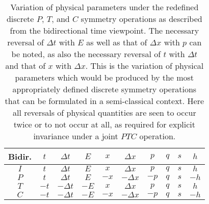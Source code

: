 \documentclass[notitlepage,12pt]{report}
\begin{document}
\begin{table}
\begin{center}
\begin{tabular}{c||c|c|c||c|c|c||c|c|c}
Bidir. & $t$  & $\Delta t$  & $E$ & $x$ & $\Delta x$ & $p$ & $q$ & $s$ & $h$ \\  \hline\hline
$I$ & $t$  & $\Delta t$  & $E$ & $x$ & $\Delta x$ & $p$ & $q$ & $s$ & $h$ \\  \hline
$P$ & $t$  & $\Delta t$  & $E$ & $-x$ & $-\Delta x$ & $-p$ & $q$ & $s$ & $-h$ \\  \hline
$T$ & $-t$ & $-\Delta t$  & $-E$ & $x$ & $\Delta x$ & $p$ & $q$ & $s$ & $h$  \\  \hline
$C$ & $-t$ & $-\Delta t$  & $-E$ & $-x$ & $-\Delta x$ & $-p$ & $q$ & $s$ & $-h$  
\end{tabular}
\end{center}
\caption[Variation of physical parameters under the redefined discrete $P$, $T$, and $C$ symmetry operations as described from the bidirectional time viewpoint]{Variation of physical parameters under the redefined discrete $P$, $T$, and $C$ symmetry operations as described from the bidirectional time viewpoint. The necessary reversal of $\Delta t$ with $E$ as well as that of $\Delta x$ with $p$ can be noted, as also the necessary reversal of $t$ with $\Delta t$ and that of $x$ with $\Delta x$. This is the variation of physical parameters which would be produced by the most appropriately defined discrete symmetry operations that can be formulated in a semi-classical context. Here all reversals of physical quantities are seen to occur twice or to not occur at all, as required for explicit invariance under a joint $PTC$ operation.}\label{tab:3.3}
\end{table}
\end{document}
